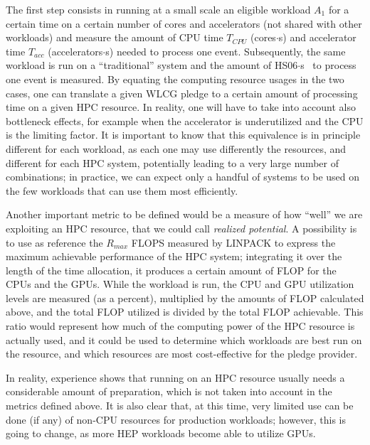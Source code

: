 The first step consists in running at a small scale an eligible
workload $A_1$ for a certain time on a certain number of cores and
accelerators (not shared with other workloads) and measure the amount
of CPU time $T_{CPU}$ (cores$\cdot$s) and accelerator time $T_{acc}$
(accelerators$\cdot$s) needed to process one event. Subsequently, the
same workload is run on a ``traditional'' system and the amount of
HS06$\cdot$s~\cite{hs06} to process one event is measured. By equating
the computing resource usages in the two cases, one can translate a
given WLCG pledge to a certain amount of processing time on a given
HPC resource. In reality, one will have to take into account also
bottleneck effects, for example when the accelerator is underutilized
and the CPU is the limiting factor. It is important to know that this
equivalence is in principle different for each workload, as each one
may use differently the resources, and different for each HPC system,
potentially leading to a very large number of combinations; in
practice, we can expect only a handful of systems to be used on the
few workloads that can use them most efficiently.

Another important metric to be defined would be a measure of how
``well'' we are exploiting an HPC resource, that we could call
\emph{realized potential}. A possibility is to use as reference the
$R_{max}$ FLOPS measured by LINPACK to express the
maximum achievable performance of the HPC system; integrating it over
the length of the time allocation, it produces a certain amount of
FLOP for the CPUs and the GPUs. While the workload is run, the CPU and
GPU utilization levels are measured (as a percent), multiplied by the
amounts of FLOP calculated above, and the total FLOP utilized is
divided by the total FLOP achievable. This ratio would represent how
much of the computing power of the HPC resource is actually used, and
it could be used to determine which workloads are best run on the
resource, and which resources are most cost-effective for the pledge
provider.

In reality, experience shows that running on an HPC resource usually
needs a considerable amount of preparation, which is not taken into
account in the metrics defined above. It is also clear that, at this
time, very limited use can be done (if any) of non-CPU resources for
production workloads; however, this is going to change, as more HEP
workloads become able to utilize GPUs.
